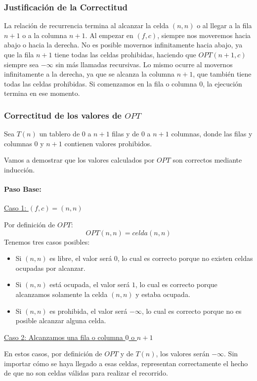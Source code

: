 \subsubsection{Justificación de la Correctitud}

La relación de recurrencia termina al alcanzar la celda $(n,n)$ o al llegar a la fila $n+1$ o a la columna $n+1$. 
Al empezar en $(f,c)$, siempre nos moveremos hacia abajo o hacia la derecha. No es posible movernos infinitamente hacia abajo, ya que la fila $n+1$ tiene todas las celdas prohibidas, haciendo que $OPT(n+1,c)$ siempre sea $-\infty$ sin más llamadas recursivas. Lo mismo ocurre al movernos infinitamente a la derecha, ya que se alcanza la columna $n+1$, que también tiene todas las celdas prohibidas. 
Si comenzamos en la fila o columna $0$, la ejecución termina en ese momento. 

\subsubsection{Correctitud de los valores de $OPT$}

Sea $T(n)$ un tablero de $0$ a $n+1$ filas y de $0$ a $n+1$ columnas, donde las filas y columnas $0$ y $n+1$ contienen valores prohibidos.

Vamos a demostrar que los valores calculados por $OPT$ son correctos mediante inducción.

\paragraph{Paso Base:} 
\underline{Caso 1: $(f,c) = (n,n)$} 

Por definición de $OPT$:
\[
OPT(n,n) = celda(n,n) 
\]
Tenemos tres casos posibles:
\begin{itemize}
    \item Si $(n,n)$ es libre, el valor será $0$, lo cual es correcto porque no existen celdas ocupadas por alcanzar.
    \item Si $(n,n)$ está ocupada, el valor será $1$, lo cual es correcto porque alcanzamos solamente la celda $(n,n)$ y estaba ocupada.
    \item Si $(n,n)$ es prohibida, el valor será $-\infty$, lo cual es correcto porque no es posible alcanzar alguna celda.
\end{itemize}

\underline{Caso 2: Alcanzamos una fila o columna $0$ o $n+1$}

En estos casos, por definición de $OPT$ y de $T(n)$, los valores serán $-\infty$. Sin importar cómo se haya llegado a esas celdas, representan correctamente el hecho de que no son celdas válidas para realizar el recorrido.

